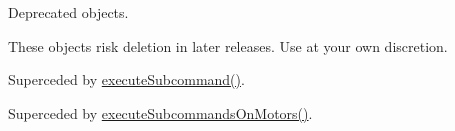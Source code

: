 Deprecated objects.

These objects risk deletion in later releases. Use at your own discretion.


\begin{DoxyRefList}
\item[Member \mbox{\hyperlink{ccnc_8h_a77e8fa224b5fb18b4b2334f49d607a8e}{run\+Scmd}} (uint scmd, uint wait, struct gpiod\+\_\+line $\ast$stp, struct gpiod\+\_\+line $\ast$dir, struct gpiod\+\_\+line $\ast$ms1, struct gpiod\+\_\+line $\ast$ms2, struct gpiod\+\_\+line $\ast$ms3)]\label{deprecated__deprecated000001}%
%
Superceded by \mbox{\hyperlink{ccnc_8h_aa2c424555e60105489ba1a88bff35d8f}{execute\+Subcommand()}}.  
\item[Member \mbox{\hyperlink{ccnc_8h_ad81d88ec29f019dcfc23c8cbb989ed1e}{run\+Scmd\+From\+Array}} (uint scmd\mbox{[}5\mbox{]}, uint wait, struct gpiod\+\_\+line $\ast$stp, struct gpiod\+\_\+line $\ast$dir, struct gpiod\+\_\+line $\ast$ms1, struct gpiod\+\_\+line $\ast$ms2, struct gpiod\+\_\+line $\ast$ms3)]\label{deprecated__deprecated000002}%
%
Superceded by \mbox{\hyperlink{ccnc_8h_aadbb53306b223d75b33eb606f05819ed}{execute\+Subcommands\+On\+Motors()}}. 
\end{DoxyRefList}